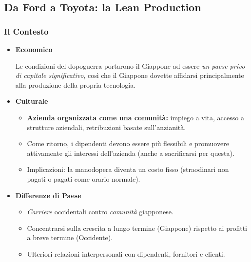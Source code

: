 \documentclass[a4paper,portrait,12pt]{article}
\theoremstyle{definition}
\begin{document}


\subsection{Da Ford a Toyota: la Lean Production}

\subsubsection{Il Contesto}
\begin{itemize}
\item \textbf{Economico}
	\begin{itemize}
	Le condizioni del dopoguerra portarono il Giappone ad essere \emph{un paese privo di capitale significativo}, così che il Giappone dovette affidarsi principalmente alla produzione della propria tecnologia.
	\end{itemize}

\item \textbf{Culturale}
	\begin{itemize}
	\item \textbf{Azienda organizzata come una comunità:} impiego a vita, accesso a strutture aziendali, retribuzioni basate sull'anzianità.
	\item Come ritorno, i dipendenti devono essere più flessibili e promuovere attivamente gli interessi dell'azienda (anche a sacrificarsi per questa).
	\item Implicazioni: la manodopera diventa un costo fisso (straodinari non pagati o pagati come orario normale).
	\end{itemize}
	
\item \textbf{Differenze di Paese}
	\begin{itemize}
	\item \emph{Carriere} occidentali contro \emph{comunità} giapponese.
	\item Concentrarsi sulla crescita a lungo termine (Giappone) rispetto ai profitti a breve termine (Occidente).
	\item Ulteriori relazioni interpersonali con dipendenti, fornitori e clienti.
	\end{itemize}
\end{itemize}
\end{document}
